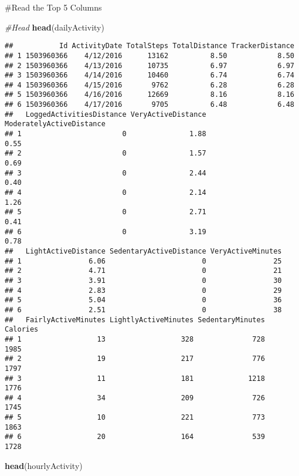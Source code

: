 \documentclass[
]{article}
\newenvironment{Shaded}{\begin{snugshade}}{\end{snugshade}}
\newcommand{\CommentTok}[1]{\textcolor[rgb]{0.56,0.35,0.01}{\textit{#1}}}
\newcommand{\FunctionTok}[1]{\textcolor[rgb]{0.13,0.29,0.53}{\textbf{#1}}}
\newcommand{\NormalTok}[1]{#1}
\begin{document}
\#Read the Top 5 Columns

\begin{Shaded}
\begin{Highlighting}[]
\CommentTok{\#Head}
\FunctionTok{head}\NormalTok{(dailyActivity)}
\end{Highlighting}
\end{Shaded}

\begin{verbatim}
##           Id ActivityDate TotalSteps TotalDistance TrackerDistance
## 1 1503960366    4/12/2016      13162          8.50            8.50
## 2 1503960366    4/13/2016      10735          6.97            6.97
## 3 1503960366    4/14/2016      10460          6.74            6.74
## 4 1503960366    4/15/2016       9762          6.28            6.28
## 5 1503960366    4/16/2016      12669          8.16            8.16
## 6 1503960366    4/17/2016       9705          6.48            6.48
##   LoggedActivitiesDistance VeryActiveDistance ModeratelyActiveDistance
## 1                        0               1.88                     0.55
## 2                        0               1.57                     0.69
## 3                        0               2.44                     0.40
## 4                        0               2.14                     1.26
## 5                        0               2.71                     0.41
## 6                        0               3.19                     0.78
##   LightActiveDistance SedentaryActiveDistance VeryActiveMinutes
## 1                6.06                       0                25
## 2                4.71                       0                21
## 3                3.91                       0                30
## 4                2.83                       0                29
## 5                5.04                       0                36
## 6                2.51                       0                38
##   FairlyActiveMinutes LightlyActiveMinutes SedentaryMinutes Calories
## 1                  13                  328              728     1985
## 2                  19                  217              776     1797
## 3                  11                  181             1218     1776
## 4                  34                  209              726     1745
## 5                  10                  221              773     1863
## 6                  20                  164              539     1728
\end{verbatim}

\begin{Shaded}
\begin{Highlighting}[]
\FunctionTok{head}\NormalTok{(hourlyActivity)}
\end{Highlighting}
\end{Shaded}
\end{document}
